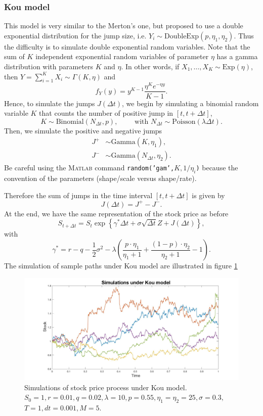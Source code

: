 \subsubsection{Kou model}
This model is very similar to the Merton's one, but \citeauthor{Kou02} proposed to use a double exponential distribution for the jump size, i.e. $Y_i\sim\text{DoubleExp}(p,\eta_1,\eta_2)$. Thus the difficulty is to simulate double exponential random variables. Note that the sum of $K$ independent exponential random variables of parameter $\eta$ has a gamma distribution with parameters $K$ and $\eta$. In other words, if $X_1,\ldots,X_K\sim\text{Exp}(\eta)$, then $Y = \sum_{i=1}^K X_i\sim\Gamma(K,\eta)$ and
$$f_Y(y) = y^{K-1}\frac{\eta^K e^{-\eta y}}{K-1}.$$
Hence, to simulate the jumps $J(\Delta t)$, we begin by simulating a binomial random variable $K$ that counts the number of positive jump in $[t,t+\Delta t]$,
$$K \sim \text{Binomial}(N_{\Delta t},p), \qquad \text{ with } N_{\Delta t}\sim \text{Poisson}(\lambda\Delta t).$$
Then, we simulate the positive and negative jumps
\begin{align*}
J^+&\sim\text{Gamma}(K,\eta_1), \\
J^-&\sim\text{Gamma}(N_{\Delta t},\eta_2).
\end{align*}
Be careful using the \textsc{Matlab} command \texttt{random('gam',$K,1/\eta_i$)} because the convention of the parameters (shape/scale versus shape/rate).

Therefore the sum of jumps in the time interval $[t,t+\Delta t]$ is given by
$$J(\Delta t) = J^+-J^-.$$
At the end, we have the same representation of the stock price as before
$$S_{t+\Delta t} = S_t\exp\left\{\gamma^\ast \Delta t + \sigma \sqrt{\Delta t}Z + J(\Delta t)\right\},$$
with
$$ \gamma^\ast=r-q- \frac{1}{2}\sigma^2 -\lambda \left(\frac{p\cdot\eta_1}{\eta_1+1}+\frac{(1-p)\cdot\eta_2}{\eta_2+1}-1\right).$$
The simulation of sample paths under Kou model are illustrated in figure \ref{fig:MC:Kou}
\begin{figure}[!htb]
	\includegraphics[width=\textwidth]{gfx/Kou_plot}
	\caption{Simulations of stock price process under Kou model.\\ $S_0=1, r= 0.01,q = 0.02,\lambda = 10 , p = 0.55, \eta_1 =\eta_2= 25, \sigma=0.3,$\\$T = 1, dt = 0.001, M=5$.}
	\label{fig:MC:Kou}
\end{figure}

